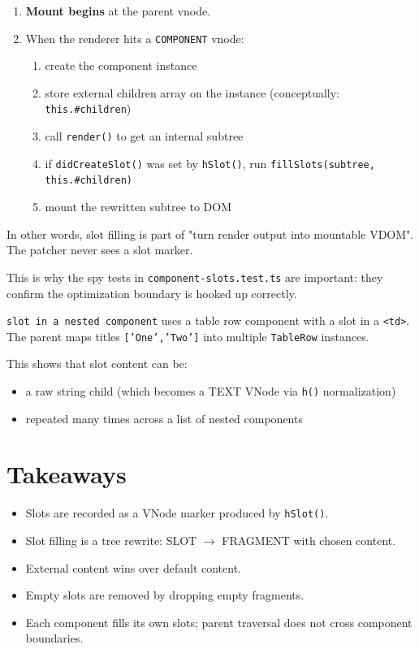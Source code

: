 \begin{enumerate}
  \item \textbf{Mount begins} at the parent vnode.
  \item When the renderer hits a \texttt{COMPONENT} vnode:
    \begin{enumerate}
  \item create the component instance
  \item store external children array on the instance (conceptually: \texttt{this.\#children})
  \item call \texttt{render()} to get an internal subtree
  \item if \texttt{didCreateSlot()} was set by \texttt{hSlot()}, run \texttt{fillSlots(subtree, this.\#children)}
  \item mount the rewritten subtree to DOM
    \end{enumerate}
\end{enumerate}

In other words, slot filling is part of "turn render output into mountable VDOM".
The patcher never sees a slot marker.

This is why the spy tests in \texttt{component-slots.test.ts} are important: they confirm the optimization boundary is hooked up correctly.

\texttt{slot in a nested component} uses a table row component with a slot in a \texttt{<td>}.
The parent maps titles \texttt{['One','Two']} into multiple \texttt{TableRow} instances.

This shows that slot content can be:

\begin{itemize}
  \item a raw string child (which becomes a TEXT VNode via \texttt{h()} normalization)
  \item repeated many times across a list of nested components
\end{itemize}

\section{Takeaways}

\begin{itemize}
  \item Slots are recorded as a VNode marker produced by \texttt{hSlot()}.
  \item Slot filling is a tree rewrite: SLOT \(\rightarrow\) FRAGMENT with chosen content.
  \item External content wins over default content.
  \item Empty slots are removed by dropping empty fragments.
  \item Each component fills its own slots; parent traversal does not cross component boundaries.
\end{itemize}

